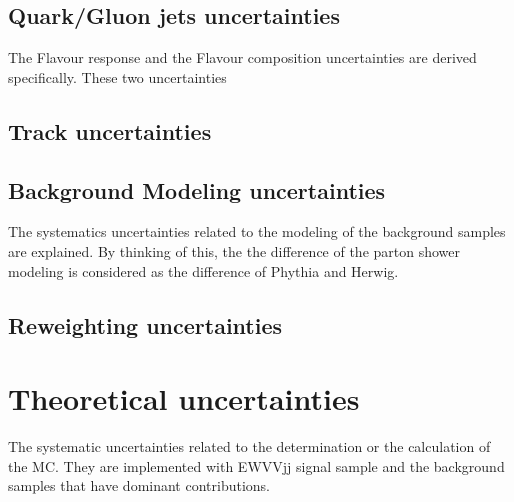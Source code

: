 \subsection{Quark/Gluon jets uncertainties}
The Flavour response and the Flavour composition uncertainties are derived specifically.
These two uncertainties 
\subsection{Track uncertainties}
\subsection{Background Modeling uncertainties}
The systematics uncertainties related to the modeling of the background samples are explained.
By thinking of this, the the difference of the parton shower modeling is considered as the difference of Phythia and Herwig.
\subsection{Reweighting uncertainties}

\section{Theoretical uncertainties}
The systematic uncertainties related to the determination or the calculation of the MC.
They are implemented with EWVVjj signal sample and the background samples that have dominant contributions. 

